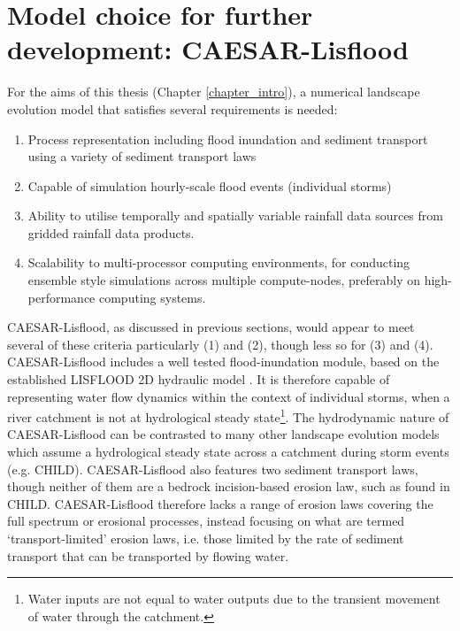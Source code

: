 \section{Model choice for further development: CAESAR-Lisflood}

For the aims of this thesis (Chapter \ref{chapter_intro}), a numerical landscape evolution model that satisfies several requirements is needed:

\begin{enumerate}
\item Process representation including flood inundation and sediment transport using a variety of sediment transport laws
\item Capable of simulation hourly-scale flood events (individual storms)
\item Ability to utilise temporally and spatially variable rainfall data sources from gridded rainfall data products.
\item Scalability to multi-processor computing environments, for conducting ensemble style simulations across multiple compute-nodes, preferably on high-performance computing systems.
\end{enumerate}


CAESAR-Lisflood, as discussed in previous sections, would appear to meet several of these criteria particularly (1) and (2), though less so for (3) and (4). CAESAR-Lisflood includes a well tested flood-inundation module, based on the established LISFLOOD 2D hydraulic model \citep{Bates1998}. It is therefore capable of representing water flow dynamics within the context of individual storms, when a river catchment is not at hydrological steady state\footnote{Water inputs are not equal to water outputs due to the transient movement of water through the catchment.}. The hydrodynamic nature of CAESAR-Lisflood can be contrasted to many other landscape evolution models which assume a hydrological steady state across a catchment during storm events (e.g. CHILD). CAESAR-Lisflood also features two sediment transport laws, though neither of them are a bedrock incision-based erosion law, such as found in CHILD. CAESAR-Lisflood therefore lacks a range of erosion laws covering the full spectrum or erosional processes, instead focusing on what are termed `transport-limited' erosion laws, i.e. those limited by the rate of sediment transport that can be transported by flowing water. 

